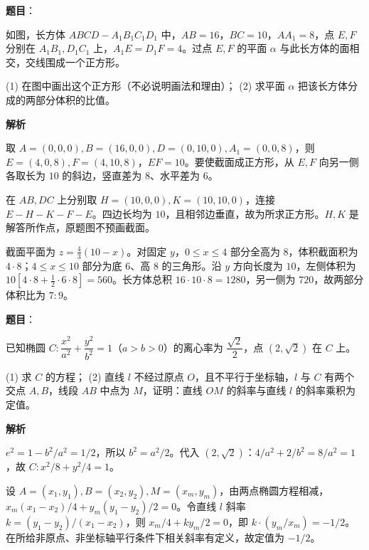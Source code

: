 \begin{answer}

\textbf{题目}：

如图，长方体 $ABCD-A_1B_1C_1D_1$ 中，$AB=16$，$BC=10$，$AA_1=8$，点 $E,F$ 分别在 $A_1B_1,D_1C_1$ 上，$A_1E=D_1F=4$。过点 $E,F$ 的平面 $\alpha$ 与此长方体的面相交，交线围成一个正方形。

(1) 在图中画出这个正方形（不必说明画法和理由）；  
(2) 求平面 $\alpha$ 把该长方体分成的两部分体积的比值。
\nopagebreak[4]
\begin{center}\end{center}
\nopagebreak[4]
\textbf{解析}

取 $A=(0,0,0),B=(16,0,0),D=(0,10,0),A_1=(0,0,8)$，则 $E=(4,0,8),F=(4,10,8)$，$EF=10$。要使截面成正方形，从 $E,F$ 向另一侧各取长为 $10$ 的斜边，竖直差为 $8$、水平差为 $6$。


在 $AB,DC$ 上分别取 $H=(10,0,0),K=(10,10,0)$，连接 $E-H-K-F-E$。四边长均为 $10$，且相邻边垂直，故为所求正方形。$H,K$ 是解答所作点，原题图不预画截面。
\nopagebreak[4]
\begin{center}\end{center}
\nopagebreak[4]

截面平面为 $z=\frac43(10-x)$。对固定 $y$，$0\le x\le4$ 部分全高为 $8$，体积截面积为 $4\cdot8$；$4\le x\le10$ 部分为底 $6$、高 $8$ 的三角形。沿 $y$ 方向长度为 $10$，左侧体积为 $10[4\cdot8+\frac12\cdot6\cdot8]=560$。长方体总积 $16\cdot10\cdot8=1280$，另一侧为 $720$，故两部分体积比为 $7:9$。



\end{answer}
\begin{answer}

\textbf{题目}：

已知椭圆 $C:\dfrac{x^2}{a^2}+\dfrac{y^2}{b^2}=1$（$a>b>0$）的离心率为 $\dfrac{\sqrt2}2$，点 $(2,\sqrt2)$ 在 $C$ 上。

(1) 求 $C$ 的方程；  
(2) 直线 $l$ 不经过原点 $O$，且不平行于坐标轴，$l$ 与 $C$ 有两个交点 $A,B$，线段 $AB$ 中点为 $M$，证明：直线 $OM$ 的斜率与直线 $l$ 的斜率乘积为定值。

\textbf{解析}


$e^2=1-b^2/a^2=1/2$，所以 $b^2=a^2/2$。代入 $(2,\sqrt2)$：$4/a^2+2/b^2=8/a^2=1$，故 $C:x^2/8+y^2/4=1$。


设 $A=(x_1,y_1),B=(x_2,y_2),M=(x_m,y_m)$，由两点椭圆方程相减，$x_m(x_1-x_2)/4+y_m(y_1-y_2)/2=0$。令直线 $l$ 斜率 $k=(y_1-y_2)/(x_1-x_2)$，则 $x_m/4+k y_m/2=0$，即 $k\cdot(y_m/x_m)=-1/2$。在所给非原点、非坐标轴平行条件下相关斜率有定义，故定值为 $-1/2$。



\end{answer}
